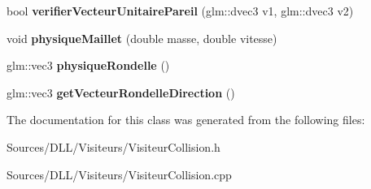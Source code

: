 \begin{DoxyCompactItemize}
\item 
bool {\bfseries verifier\+Vecteur\+Unitaire\+Pareil} (glm\+::dvec3 v1, glm\+::dvec3 v2)\hypertarget{class_visiteur_collision_a3e112285cc0c56e5d38f1e9251976755}{}\label{class_visiteur_collision_a3e112285cc0c56e5d38f1e9251976755}

\item 
void {\bfseries physique\+Maillet} (double masse, double vitesse)\hypertarget{class_visiteur_collision_a80eb192b1ecb75a5a1986c49412a8f7e}{}\label{class_visiteur_collision_a80eb192b1ecb75a5a1986c49412a8f7e}

\item 
glm\+::vec3 {\bfseries physique\+Rondelle} ()\hypertarget{class_visiteur_collision_adecffd4c9b328d14e7a56bda97843abc}{}\label{class_visiteur_collision_adecffd4c9b328d14e7a56bda97843abc}

\item 
glm\+::vec3 {\bfseries get\+Vecteur\+Rondelle\+Direction} ()\hypertarget{class_visiteur_collision_a64b11dbb62caa5952b4bbfd491aac5ef}{}\label{class_visiteur_collision_a64b11dbb62caa5952b4bbfd491aac5ef}

\end{DoxyCompactItemize}


The documentation for this class was generated from the following files\+:\begin{DoxyCompactItemize}
\item 
Sources/\+D\+L\+L/\+Visiteurs/Visiteur\+Collision.\+h\item 
Sources/\+D\+L\+L/\+Visiteurs/Visiteur\+Collision.\+cpp\end{DoxyCompactItemize}
